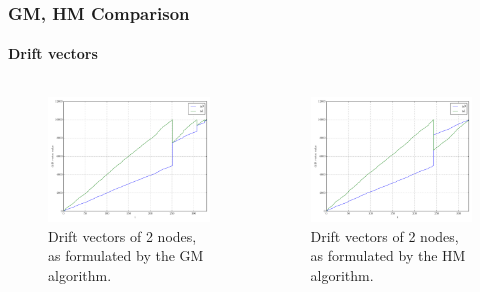 \documentclass[hyperref={pdfpagelabels=false}]{beamer}
\begin{document}
\begin{frame} \frametitle{GM, HM Comparison} \framesubtitle{Drift vectors}
\begin{columns}
\begin{column}[t]{0.5\linewidth}
\begin{figure}
\vspace{-1cm}
\centering
  \includegraphics[scale=0.25]{../img/bal_classic_drifts_linear2N.pdf}
  \caption{Drift vectors of 2 nodes, as formulated by the GM algorithm.}
\end{figure}
\end{column}
\begin{column}[t]{0.5\linewidth}
\begin{figure}
\vspace{-1cm}
\centering
  \includegraphics[scale=0.25]{../img/bal_heuristic_drifts_linear2N.pdf}
  \caption{Drift vectors of 2 nodes, as formulated by the HM algorithm.}
\end{figure}
\end{column}
\end{columns}
\end{frame}
\end{document}
